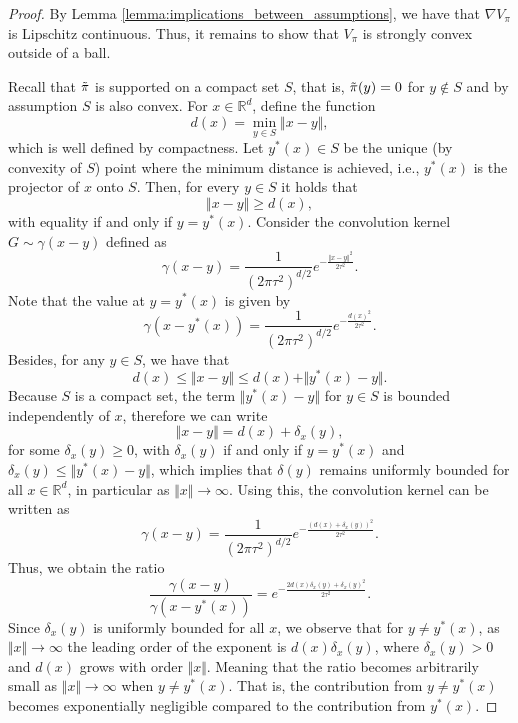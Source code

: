 \begin{proof}
By Lemma \ref{lemma:implications_between_assumptions}, we have that $\nabla V_\pi$ is Lipschitz continuous. Thus, it remains to show that $V_\pi$ is strongly convex outside of a ball.

Recall that $\Tilde{\pi}$ is supported on a compact set $S$, that is, $\Tilde{\pi}(y)=0$ for $y\notin S$ and by assumption $S$ is also convex.
For $x\in\mathbb{R}^d$, define the function
\begin{equation*}
    d(x) = \min_{y\in S} \Vert x-y\Vert,
\end{equation*}
which is well defined by compactness. 
Let $y^*(x)\in S$ be the unique (by convexity of $S$) point where the minimum distance is achieved, i.e., $y^*(x)
$ is the projector of $x$ onto $S$. Then, for every $y\in S$ it holds that
\begin{equation*}
    \Vert x-y\Vert\geq d(x),
\end{equation*}
with equality if and only if $y = y^*(x)$. 
Consider the convolution kernel $G\sim\gamma(x-y)$ defined as
\begin{equation*}
    \gamma(x-y)=\frac{1}{(2\pi\tau^2)^{d/2}}e^{-\frac{\Vert x-y\Vert^2}{2\tau^2}}.
\end{equation*}
Note that the value at $y = y^*(x)$ is given by
\begin{equation*}
    \gamma(x-y^*(x))=\frac{1}{(2\pi\tau^2)^{d/2}}e^{-\frac{d(x)^2}{2\tau^2}}.
\end{equation*}
Besides, for any $y\in S$, we have that
\begin{equation*}
    d(x)\leq\Vert x-y\Vert\leq d(x) + \Vert y^*(x)-y\Vert.
\end{equation*}
Because $S$ is a compact set, the term $\Vert y^*(x)-y\Vert$ for $y\in S$ is bounded independently of $x$, therefore we can write
\begin{equation*}
    \Vert x-y\Vert = d(x) + \delta_x(y),
\end{equation*}
for some $\delta_x(y)\geq 0$, with $\delta_x(y)$ if and only if $y=y^*(x)$ and $\delta_x(y)\leq\Vert y^*(x)-y\Vert$, which implies that $\delta(y)$ remains uniformly bounded for all $x\in\mathbb{R}^d$, in particular as $\Vert x\Vert\to\infty$.
Using this, the convolution kernel can be written as
\begin{equation*}
    \gamma(x-y) = \frac{1}{(2\pi\tau^2)^{d/2}}e^{-\frac{(d(x) + \delta_x(y))^2}{2\tau^2}}.
\end{equation*}
Thus, we obtain the ratio
\begin{equation*}
    \frac{\gamma(x-y)}{\gamma(x-y^*(x))} = e^{-\frac{2d(x)\delta_x(y) + \delta_x(y)^2}{2\tau^2}}.
\end{equation*}
Since $\delta_x(y)$ is uniformly bounded for all $x$, we observe that for $y\neq y^*(x)$, as $\Vert x\Vert\to\infty$ the leading order of the exponent is $d(x)\delta_x(y)$, where $\delta_x(y)>0$ and $d(x)$ grows with order $\Vert x\Vert$. 
Meaning that the ratio becomes arbitrarily small as $\Vert x\Vert \to\infty$ when $y\neq y^*(x)$.
That is, the contribution from $y\neq y^*(x)$ becomes exponentially negligible compared to the contribution from $y^*(x)$.


\end{proof}
